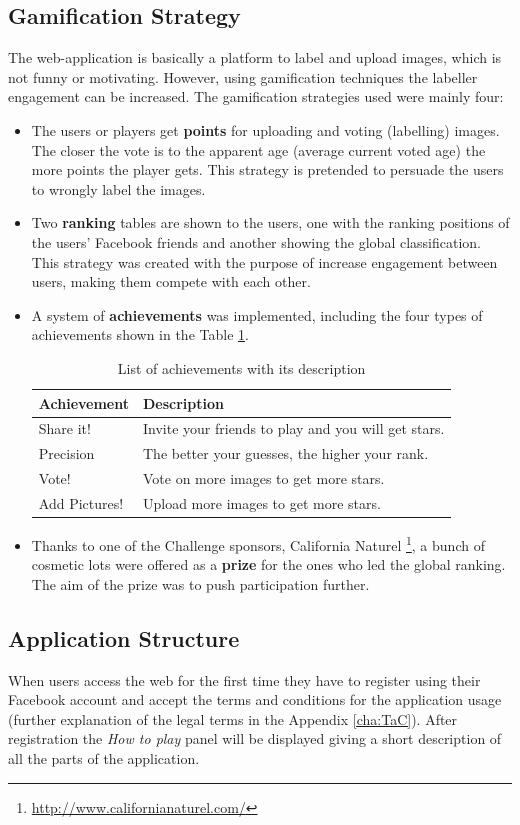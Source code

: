 \subsection{Gamification Strategy}
The web-application is basically a platform to label and upload images, which is not funny or motivating. However, using gamification techniques the labeller engagement can be increased. The gamification strategies used were mainly four:

\begin{itemize}
	\item The users or players get \textbf{points} for uploading and voting (labelling) images. The closer the vote is to the apparent age (average current voted age) the more points the player gets. This strategy is pretended to persuade the users to wrongly label the images.
	\item Two \textbf{ranking} tables are shown to the users, one with the ranking positions of the users' Facebook friends and another showing the global classification. This strategy was created with the purpose of increase engagement between users, making them compete with each other. 
	\item A system of \textbf{achievements} was implemented, including the four types of achievements shown in the Table \ref{tab:achiev}.
	\begin{table}[!h]
		\centering
		\begin{tabular}{l|l}
			\textbf{Achievement} & \textbf{Description} \\ \hline
			Share it! &	Invite your friends to play and you will get stars.	\\
			Precision &	The better your guesses, the higher your rank. \\
			Vote! &	Vote on more images to get more stars.\\	
			Add Pictures! &	Upload more images to get more stars. \\
		\end{tabular}
		\caption{List of achievements with its description}
		\label{tab:achiev}
	\end{table}
	\item Thanks to one of the Challenge sponsors, California Naturel \footnote{\url{http://www.californianaturel.com/}}, a bunch of cosmetic lots were offered as a \textbf{prize} for the ones who led the global ranking. The aim of the prize was to push participation further.
\end{itemize}


\subsection{Application Structure}
When users access the web for the first time they have to register using their Facebook account and accept the terms and conditions for the application usage (further explanation of the legal terms in the Appendix \ref{cha:TaC}). After registration the \textit{How to play} panel will be displayed giving a short description of all the parts of the application.

